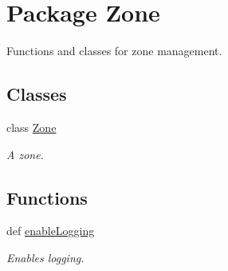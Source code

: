 \hypertarget{namespace_zone}{
\section{Package Zone}
\label{namespace_zone}
}


Functions and classes for zone management.  


\subsection*{Classes}
\begin{DoxyCompactItemize}
\item 
class \hyperlink{class_zone_1_1_zone}{Zone}
\begin{DoxyCompactList}\small\item\em A zone. \item\end{DoxyCompactList}\end{DoxyCompactItemize}
\subsection*{Functions}
\begin{DoxyCompactItemize}
\item 
def \hyperlink{namespace_zone_aaa40a627f781a072131be03ac8e08328}{enableLogging}
\begin{DoxyCompactList}\small\item\em Enables logging. \item\end{DoxyCompactList}\end{DoxyCompactItemize}
